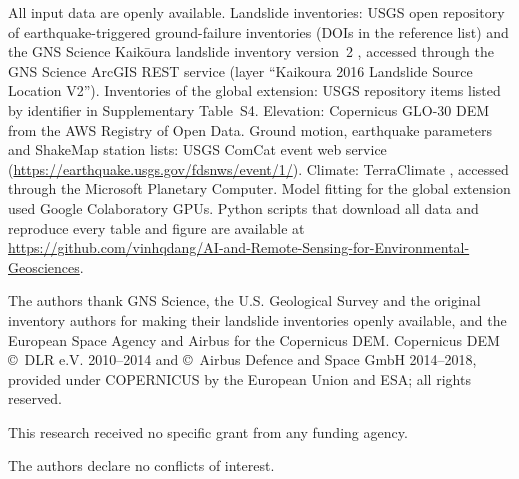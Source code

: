 All input data are openly available. Landslide inventories: USGS open repository of earthquake-triggered ground-failure inventories \citep{schmitt2017} (DOIs in the reference list) and the GNS Science Kaik\={o}ura landslide inventory version~2 \citep{data_kaikoura}, accessed through the GNS Science ArcGIS REST service (layer ``Kaikoura 2016 Landslide Source Location V2''). Inventories of the global extension: USGS repository items listed by identifier in Supplementary Table~S4. Elevation: Copernicus GLO-30 DEM \citep{copdem} from the AWS Registry of Open Data. Ground motion, earthquake parameters and ShakeMap station lists: USGS ComCat event web service (\url{https://earthquake.usgs.gov/fdsnws/event/1/}). Climate: TerraClimate \citep{abatzoglou2018}, accessed through the Microsoft Planetary Computer. Model fitting for the global extension used Google Colaboratory GPUs. Python scripts that download all data and reproduce every table and figure are available at \url{https://github.com/vinhqdang/AI-and-Remote-Sensing-for-Environmental-Geosciences}.

The authors thank GNS Science, the U.S. Geological Survey and the original inventory authors for making their landslide inventories openly available, and the European Space Agency and Airbus for the Copernicus DEM. Copernicus DEM \copyright~DLR e.V. 2010--2014 and \copyright~Airbus Defence and Space GmbH 2014--2018, provided under COPERNICUS by the European Union and ESA; all rights reserved.

This research received no specific grant from any funding agency.

The authors declare no conflicts of interest.
